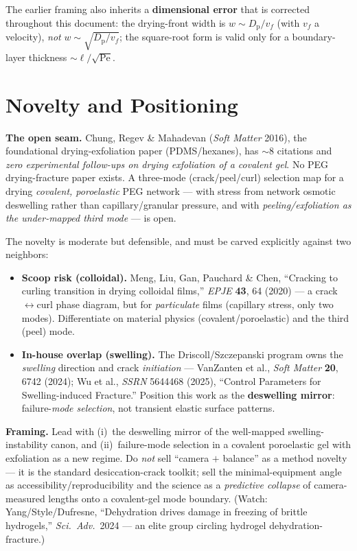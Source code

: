 \documentclass[12pt,letterpaper]{article}
\newcommand{\Dp}{D_{\mathrm{p}}}
\begin{document}
The earlier framing also inherits a \textbf{dimensional error} that is corrected
throughout this document: the drying-front width is $w \sim \Dp/v_f$ (with $v_f$
a velocity), \emph{not} $w\sim\sqrt{\Dp/v_f}$; the square-root form is valid only
for a boundary-layer thickness $\sim \ell/\sqrt{\mathrm{Pe}}$.

\section{Novelty and Positioning}
\begin{gapbox}
\textbf{The open seam.} Chung, Regev \& Mahadevan (\emph{Soft Matter} 2016), the
foundational drying-exfoliation paper (PDMS/hexanes), has $\sim$8 citations and
\emph{zero experimental follow-ups on drying exfoliation of a covalent gel}. No
PEG drying-fracture paper exists. A three-mode (crack/peel/curl) selection map
for a drying \emph{covalent, poroelastic} PEG network --- with stress from
network osmotic deswelling rather than capillary/granular pressure, and with
\emph{peeling/exfoliation as the under-mapped third mode} --- is open.
\end{gapbox}

\noindent The novelty is moderate but defensible, and must be carved explicitly
against two neighbors:
\begin{itemize}[leftmargin=1.4em,itemsep=1pt]
\item \textbf{Scoop risk (colloidal).} Meng, Liu, Gan, Pauchard \& Chen,
``Cracking to curling transition in drying colloidal films,'' \emph{EPJE}
\textbf{43}, 64 (2020) --- a crack$\leftrightarrow$curl phase diagram, but for
\emph{particulate} films (capillary stress, only two modes). Differentiate on
material physics (covalent/poroelastic) and the third (peel) mode.
\item \textbf{In-house overlap (swelling).} The Driscoll/Szczepanski program owns
the \emph{swelling} direction and crack \emph{initiation} --- VanZanten et al.,
\emph{Soft Matter} \textbf{20}, 6742 (2024); Wu et al., \emph{SSRN} 5644468
(2025), ``Control Parameters for Swelling-induced Fracture.'' Position this work
as the \textbf{deswelling mirror}: failure-\emph{mode selection}, not transient
elastic surface patterns.
\end{itemize}

\begin{reviewbox}
\textbf{Framing.} Lead with (i)~the deswelling mirror of the well-mapped
swelling-instability canon, and (ii)~failure-mode selection in a covalent
poroelastic gel with exfoliation as a new regime. Do \emph{not} sell
``camera $+$ balance'' as a method novelty --- it is the standard desiccation-crack
toolkit; sell the minimal-equipment angle as accessibility/reproducibility and
the science as a \emph{predictive collapse} of camera-measured lengths onto a
covalent-gel mode boundary. (Watch: Yang/Style/Dufresne, ``Dehydration drives
damage in freezing of brittle hydrogels,'' \emph{Sci.\ Adv.}\ 2024 --- an elite
group circling hydrogel dehydration-fracture.)
\end{reviewbox}
\end{document}
